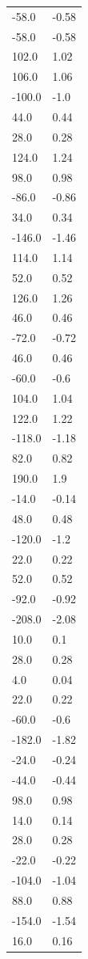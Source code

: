 \begin{longtable}{ll}
-58.0 & -0.58 \\
-58.0 & -0.58 \\
102.0 & 1.02 \\
106.0 & 1.06 \\
-100.0 & -1.0 \\
44.0 & 0.44 \\
28.0 & 0.28 \\
124.0 & 1.24 \\
98.0 & 0.98 \\
-86.0 & -0.86 \\
34.0 & 0.34 \\
-146.0 & -1.46 \\
114.0 & 1.14 \\
52.0 & 0.52 \\
126.0 & 1.26 \\
46.0 & 0.46 \\
-72.0 & -0.72 \\
46.0 & 0.46 \\
-60.0 & -0.6 \\
104.0 & 1.04 \\
122.0 & 1.22 \\
-118.0 & -1.18 \\
82.0 & 0.82 \\
190.0 & 1.9 \\
-14.0 & -0.14 \\
48.0 & 0.48 \\
-120.0 & -1.2 \\
22.0 & 0.22 \\
52.0 & 0.52 \\
-92.0 & -0.92 \\
-208.0 & -2.08 \\
10.0 & 0.1 \\
28.0 & 0.28 \\
4.0 & 0.04 \\
22.0 & 0.22 \\
-60.0 & -0.6 \\
-182.0 & -1.82 \\
-24.0 & -0.24 \\
-44.0 & -0.44 \\
98.0 & 0.98 \\
14.0 & 0.14 \\
28.0 & 0.28 \\
-22.0 & -0.22 \\
-104.0 & -1.04 \\
88.0 & 0.88 \\
-154.0 & -1.54 \\
16.0 & 0.16 \\

\end{longtable}
